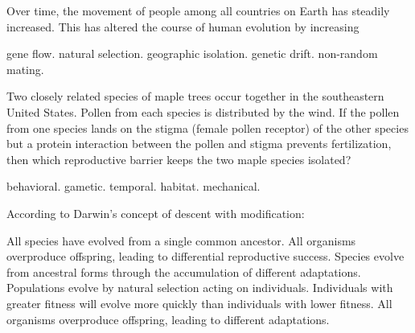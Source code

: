 \question
Over time, the movement of people among all countries on Earth has steadily increased. This has altered the course of human evolution by increasing

\begin{choices}
\correctchoice gene flow. 
\choice natural selection. 
\choice geographic isolation. 
\choice genetic drift. 
\choice non-random mating. 
\end{choices}

\question
Two closely related species of maple trees occur together in the southeastern United States.  Pollen from each species is distributed by the wind.  If the pollen from one species lands on the stigma (female pollen receptor) of the other species but a protein interaction between the pollen and stigma prevents fertilization, then which reproductive barrier keeps the two maple species isolated?

\begin{choices}
\choice behavioral.
\correctchoice gametic.
\choice temporal.
\choice habitat.
\choice mechanical.
\end{choices}

\newpage

\question
According to Darwin's concept of descent with modification:

\begin{choices}
\choice All species have evolved from a single common ancestor. 
\choice All organisms overproduce offspring, leading to differential reproductive success. 
\correctchoice Species evolve from ancestral forms through the accumulation of different adaptations. 
\choice Populations evolve by natural selection acting on individuals. 
\choice Individuals with greater fitness will evolve more quickly than individuals with lower fitness. 
\choice All organisms overproduce offspring, leading to different adaptations. 
\end{choices}
